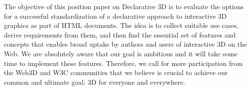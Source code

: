\documentclass[review]{acmsiggraph}
\begin{document}
The objective of this position paper on Declarative 3D is to evaluate the options for a successful standardization of a declarative approach to interactive 3D graphics as part of HTML documents. The idea is to collect suitable use cases, derive requirements from them, and then find the essential set of features and concepts that enables broad uptake by authors and users of interactive 3D on the Web.
We are absolutely aware that our goal is ambitious and it will take some time to implement these features. Therefore, we call for more participation from the Web3D and W3C communities that we believe is crucial to achieve our common and ultimate goal: 3D for everyone and everywhere.




\end{document}
